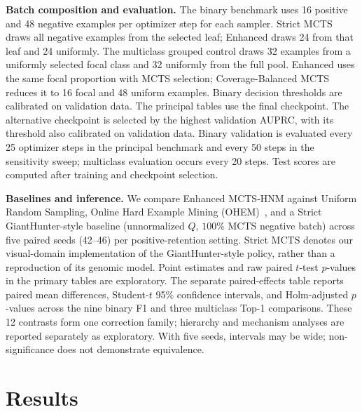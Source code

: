 \documentclass[11pt]{article}
\begin{document}
\textbf{Batch composition and evaluation.} The binary benchmark uses 16 positive and 48 negative examples per optimizer step for each sampler. Strict MCTS draws all negative examples from the selected leaf; Enhanced draws 24 from that leaf and 24 uniformly. The multiclass grouped control draws 32 examples from a uniformly selected focal class and 32 uniformly from the full pool. Enhanced uses the same focal proportion with MCTS selection; Coverage-Balanced MCTS reduces it to 16 focal and 48 uniform examples. Binary decision thresholds are calibrated on validation data. The principal tables use the final checkpoint. The alternative checkpoint is selected by the highest validation AUPRC, with its threshold also calibrated on validation data. Binary validation is evaluated every 25 optimizer steps in the principal benchmark and every 50 steps in the sensitivity sweep; multiclass evaluation occurs every 20 steps. Test scores are computed after training and checkpoint selection.

\textbf{Baselines and inference.} We compare Enhanced MCTS-HNM against Uniform Random Sampling, Online Hard Example Mining (OHEM)~\cite{shrivastava2016training}, and a Strict GiantHunter-style baseline (unnormalized $Q$, $100\%$ MCTS negative batch) across five paired seeds (42--46) per positive-retention setting. Strict MCTS denotes our visual-domain implementation of the GiantHunter-style policy, rather than a reproduction of its genomic model. Point estimates and raw paired $t$-test $p$-values in the primary tables are exploratory. The separate paired-effects table reports paired mean differences, Student-$t$ 95\% confidence intervals, and Holm-adjusted $p$-values across the nine binary F1 and three multiclass Top-1 comparisons. These 12 contrasts form one correction family; hierarchy and mechanism analyses are reported separately as exploratory. With five seeds, intervals may be wide; non-significance does not demonstrate equivalence.

\section{Results}
\label{sec:results}
\end{document}
